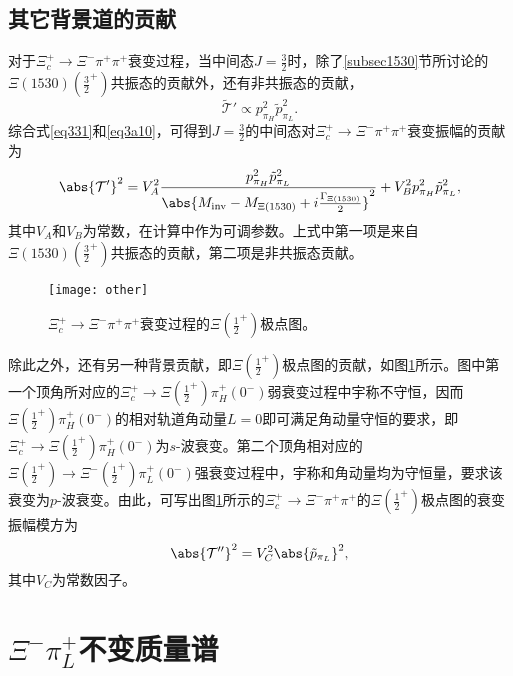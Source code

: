 \subsection{其它背景道的贡献}
对于$\Xi_{c}^{+}\to\Xi^{-}\pi^{+}\pi^{+}$衰变过程，当中间态$J=\frac{3}{2}$时，除了\ref{subsec1530}节所讨论的$\Xi(1530)(\frac{3}{2}^{+})$共振态的贡献外，还有非共振态的贡献，
\begin{equation}
\label{eq3a10}
\mathcal{\widetilde{T}}'\propto p^2_{\pi_{H}}\tilde{p}_{\pi_{L}}^2.
\end{equation}
综合式\eqref{eq331}和\eqref{eq3a10}，可得到$J=\frac{3}{2}$的中间态对$\Xi_{c}^{+}\to\Xi^{-}\pi^{+}\pi^{+}$衰变振幅的贡献为
\begin{equation}
\label{eq332}
\abs{\mathcal{T}'}^2=V_A^2\frac{p_{\pi_{H}}^2\tilde{p}_{\pi_{L}}^2}{\abs{M_{\text{inv}}-M_{\Xi(1530)}+i\frac{\Gamma_{\Xi(1530)}}{2}}^2}+V_B^2p_{\pi_{H}}^2\tilde{p}_{\pi_{L}}^2,
\end{equation}
其中$V_A$和$V_B$为常数，在计算中作为可调参数。上式中第一项是来自$\Xi(1530)(\frac{3}{2}^{+})$共振态的贡献，第二项是非共振态贡献。\par
\begin{figure}[h]
	\centering
	\texttt{[image: other]}
	\caption[$\Xi(\frac{1}{2}^{+})$极点图]{$\Xi_{c}^{+}\to\Xi^{-}\pi^{+}\pi^{+}$衰变过程的$\Xi(\frac{1}{2}^{+})$极点图。}
	\label{other}
\end{figure}
除此之外，还有另一种背景贡献，即$\Xi(\frac{1}{2}^{+})$极点图的贡献，如图\ref{other}所示。图中第一个顶角所对应的$\Xi_{c}^{+}\to\Xi(\frac{1}{2}^{+})\pi_{H}^{+}(0^{-})$弱衰变过程中宇称不守恒，因而$\Xi(\frac{1}{2}^{+})\pi_{H}^{+}(0^{-})$的相对轨道角动量$L=0$即可满足角动量守恒的要求，即$\Xi_{c}^{+}\to\Xi(\frac{1}{2}^{+})\pi_{H}^{+}(0^{-})$为$s$-波衰变。第二个顶角相对应的$\Xi(\frac{1}{2}^{+})\to\Xi^{-}(\frac{1}{2}^{+})\pi_{L}^{+}(0^{-})$强衰变过程中，宇称和角动量均为守恒量，要求该衰变为$p$-波衰变。由此，可写出图\ref{other}所示的$\Xi_{c}^{+}\to\Xi^{-}\pi^{+}\pi^{+}$的$\Xi(\frac{1}{2}^{+})$极点图的衰变振幅模方为
\begin{equation}
\label{eq333}
	\abs{\mathcal{T}''}^2=V_C^2\abs{\tilde{p}_{\pi_{L}}}^2,
\end{equation}
其中$V_C$为常数因子。
\section{$\Xi^{-}\pi_{L}^{+}$不变质量谱}
